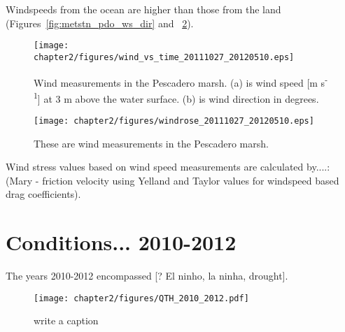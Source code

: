 Windspeeds from the ocean are higher than those from the land (Figures~\ref{fig:metstn_pdo_ws_dir} and~
\ref{fig:metstn_pdo_windrose}).

\begin{figure} \centering
\texttt{[image: chapter2/figures/wind\_vs\_time\_20111027\_20120510.eps]} \caption{Wind 
measurements in the Pescadero marsh. (a) is wind speed [m s\textsuperscript{-1}] at 3
m above the water surface. (b) is wind direction in degrees.}
\label{fig:metstn_pdo_ws_wdir} \end{figure}

 \begin{figure}
 \texttt{[image: chapter2/figures/windrose\_20111027\_20120510.eps]} \caption{These are wind 
measurements in
 the Pescadero marsh.} \label{fig:metstn_pdo_windrose} \end{figure}


Wind stress values based on wind speed measurements are calculated
by....:  (Mary - friction velocity using Yelland and Taylor values for
windspeed based drag coefficients).

% 
% 
\section{Conditions... 2010-2012} \label{conditions_label}

The years 2010-2012 encompassed [? El ninho, la ninha, drought].



\begin{figure}
\texttt{[image: chapter2/figures/QTH\_2010\_2012.pdf]} 
\caption{write a caption}\label{fig:QTH_2010_2012}  
\end{figure}

